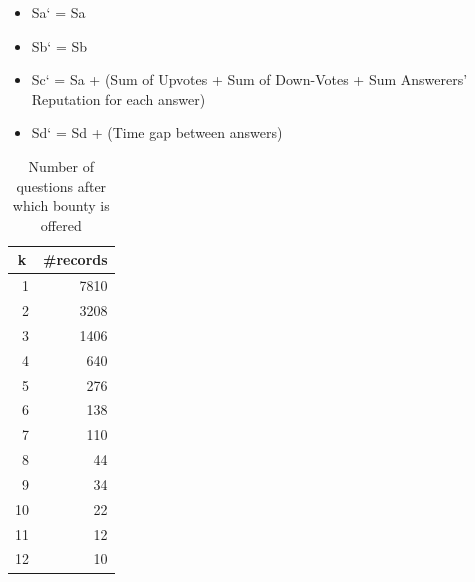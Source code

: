 \begin{itemize}
	\item Sa` = Sa
	\item Sb` = Sb
	\item Sc` = Sa + (Sum of Upvotes + Sum of Down-Votes + Sum Answerers’ Reputation for each answer) 
	\item Sd` = Sd + (Time gap between answers)
\end{itemize}


\begin{table}[]
	\centering
	\small
	\caption{Number of questions after which bounty is offered}
	\label{tab:kvalues}
\begin{tabular}{|r|r|}
\hline
\multicolumn{1}{|c|}{k} & \multicolumn{1}{c|}{\#records} \\ \hline
1                       & 7810                           \\ \hline
2                       & 3208                           \\ \hline
3                       & 1406                           \\ \hline
4                       & 640                            \\ \hline
5                       & 276                            \\ \hline
6                       & 138                            \\ \hline
7                       & 110                            \\ \hline
8                       & 44                             \\ \hline
9                       & 34                             \\ \hline
10                      & 22                             \\ \hline
11                      & 12                             \\ \hline
12                      & 10                             \\ \hline
\end{tabular}
\end{table}


